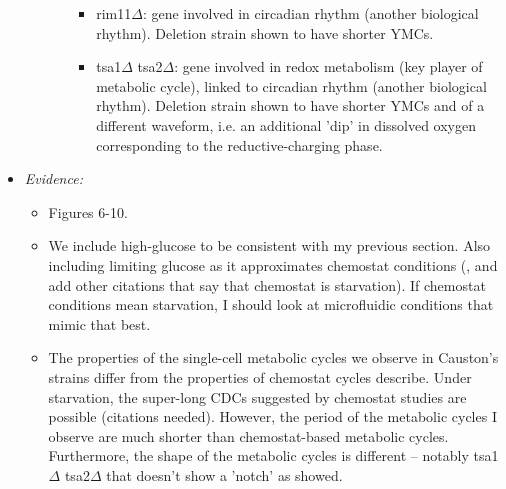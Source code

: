 \begin{itemize}
\begin{itemize}
\begin{itemize}
\begin{itemize}
\item rim11\(\Delta\): gene involved in circadian rhythm (another biological rhythm).  Deletion strain shown to have shorter YMCs.
\item tsa1\(\Delta\) tsa2\(\Delta\): gene involved in redox metabolism (key player of metabolic cycle), linked to circadian rhythm (another biological rhythm).  Deletion strain shown to have shorter YMCs and of a different waveform, i.e. an additional 'dip' in dissolved oxygen corresponding to the reductive-charging phase.
\end{itemize}
\end{itemize}
\end{itemize}
\item \emph{Evidence:}
\begin{itemize}
\item Figures 6-10.
\item We include high-glucose to be consistent with my previous section.  Also including limiting glucose as it approximates chemostat conditions (\cite{jonesCyberneticModelGrowth1999}, and add other citations that say that chemostat is starvation).  If chemostat conditions mean starvation, I should look at microfluidic conditions that mimic that best.
\item The properties of the single-cell metabolic cycles we observe in Causton's strains differ from the properties of chemostat cycles \cite{caustonMetabolicCyclesYeast2015} describe.  Under starvation, the super-long CDCs suggested by chemostat studies are possible (citations needed).  However, the period of the metabolic cycles I observe are much shorter than chemostat-based metabolic cycles.  Furthermore, the shape of the metabolic cycles is different -- notably tsa1\(\Delta\) tsa2\(\Delta\) that doesn't show a 'notch' as \cite{caustonMetabolicCyclesYeast2015} showed.
\end{itemize}


\end{itemize}
